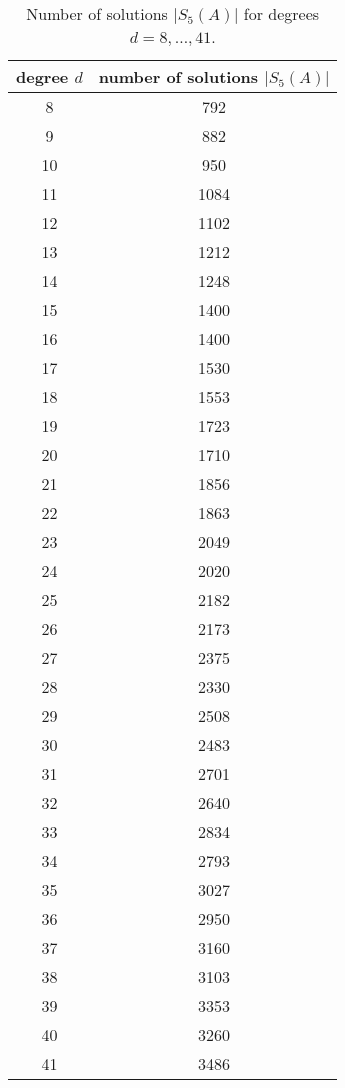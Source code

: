 \begin{table}
    \centering
    \begin{tabular}{|c|c|}
    \hline
    degree \( d \) & number of solutions \( \lvert S_5(A) \rvert \) \\ \hline
    8  & 792  \\ \hline
    9  & 882  \\ \hline
    10 & 950  \\ \hline
    11 & 1084 \\ \hline
    12 & 1102 \\ \hline
    13 & 1212 \\ \hline
    14 & 1248 \\ \hline
    15 & 1400 \\ \hline
    16 & 1400 \\ \hline
    17 & 1530 \\ \hline
    18 & 1553 \\ \hline
    19 & 1723 \\ \hline
    20 & 1710 \\ \hline
    21 & 1856 \\ \hline
    22 & 1863 \\ \hline
    23 & 2049 \\ \hline
    24 & 2020 \\ \hline
    25 & 2182 \\ \hline
    26 & 2173 \\ \hline
    27 & 2375 \\ \hline
    28 & 2330 \\ \hline
    29 & 2508 \\ \hline
    30 & 2483 \\ \hline
    31 & 2701 \\ \hline
    32 & 2640 \\ \hline
    33 & 2834 \\ \hline
    34 & 2793 \\ \hline
    35 & 3027 \\ \hline
    36 & 2950 \\ \hline
    37 & 3160 \\ \hline
    38 & 3103 \\ \hline
    39 & 3353 \\ \hline
    40 & 3260 \\ \hline
    41 & 3486 \\ \hline
    \end{tabular}
    \caption{Number of solutions \( \lvert S_5(A) \rvert \) for degrees \( d = 8, \dots, 41 \).}
    \label{tab:solutions324324324}
\end{table}

